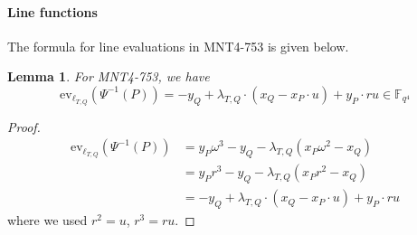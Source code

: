\documentclass{article}
\newcommand{\ev}{\mathrm{ev}}
\newcommand{\fq}[1]{\mathbb{F}_{q^{#1}}}
\theoremstyle{remark}
\theoremstyle{plain}
\newtheorem{lemma}{Lemma}[section]
\begin{document}
\paragraph{Line functions}
The formula for line evaluations in MNT4-753 is given below.

\begin{lemma}
    For MNT4-753, we have
    \[
        \ev_{\ell_{T,Q}}(\Psi^{-1}(P)) = -y_Q + \lambda_{T,Q} \cdot (x_Q - x_P \cdot u) + y_P \cdot ru \in \fq{4}
    \]
\end{lemma}

\begin{proof}
    \[
        \begin{aligned}
            \ev_{\ell_{T,Q}}(\Psi^{-1}(P)) & = y_P \omega^3 - y_Q - \lambda_{T,Q} (x_P \omega^2 - x_Q)\\
            & = y_P r^3 - y_Q - \lambda_{T,Q} (x_P r^2 - x_Q)\\
            & = -y_Q + \lambda_{T,Q} \cdot (x_Q - x_P \cdot u) + y_P \cdot ru
        \end{aligned}
    \]
    where we used $r^2 = u$, $r^3 = ru$.
\end{proof}

{}

\end{document}
